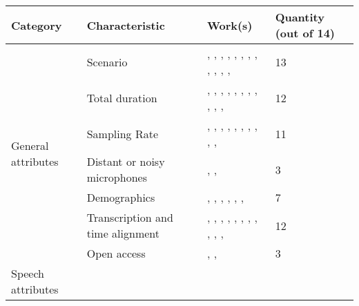 \documentclass[conference]{IEEEtran}
\begin{document}
\begin{table*}[h]
\centering
\begin{tabular}{|l|l|l|l|}
\hline
Category & Characteristic & Work(s) & Quantity (out of 14)  \\ \hline
\multirow{7}{*}{General attributes} 
    & Scenario & 
    \cite{almeman2018building}, \cite{dwivedi2017documenting}, \cite{bougrine2017altruistic}, \cite{bougrine2017altruistic}, \cite{moore2017sheffield}, \cite{ramli2017first}, \cite{goldman2016siwis}, \cite{liu2016sheffield}, \cite{ruilan2016improving}, \cite{klessa2013paralingua}, \cite{nagino2008building},  \cite{clopper2006nationwide}, \cite{zhang2008improved} & 13
    \\ \cline{2-4} & Total duration &
    \cite{dwivedi2017documenting}, \cite{bougrine2017altruistic}, \cite{bougrine2017altruistic}, \cite{moore2017sheffield}, \cite{ramli2017first}, \cite{goldman2016siwis}, \cite{liu2016sheffield}, \cite{ruilan2016improving}, \cite{klessa2013paralingua}, \cite{nagino2008building}, \cite{clopper2006nationwide}, \cite{zhang2008improved} & 12
    \\ \cline{2-4} & Sampling Rate &
    \cite{almeman2018building}, \cite{dwivedi2017documenting}, \cite{bougrine2017altruistic}, \cite{ng2017shefce}, \cite{moore2017sheffield}, \cite{ramli2017first}, \cite{goldman2016siwis}, \cite{liu2016sheffield}, \cite{ruilan2016improving}, \cite{klessa2013paralingua}, \cite{clopper2006nationwide} & 11
    \\ \cline{2-4}& Distant or noisy microphones & 
    \cite{moore2017sheffield}, \cite{ramli2017first}, \cite{liu2016sheffield} & 3
    \\ \cline{2-4} & Demographics &
    \cite{dwivedi2017documenting}, \cite{bougrine2017altruistic}, \cite{ng2017shefce}, \cite{goldman2016siwis}, \cite{ruilan2016improving}, \cite{klessa2013paralingua}, \cite{clopper2006nationwide} & 7
    \\ \cline{2-4} & Transcription and time alignment & %
    \cite{dwivedi2017documenting}, \cite{bougrine2017altruistic}, \cite{bougrine2017altruistic}, \cite{ng2017shefce}, \cite{moore2017sheffield}, \cite{ramli2017first}, \cite{goldman2016siwis}, \cite{liu2016sheffield}, \cite{ruilan2016improving}, \cite{klessa2013paralingua}, \cite{nagino2008building}, \cite{clopper2006nationwide} & 12
    \\ \cline{2-4} & Open access &
    \cite{almeman2018building}, \cite{moore2017sheffield}, \cite{liu2016sheffield} & 3
\\ \hline \multirow{3}{*}{Speech attributes}

\end{tabular}
\end{table*}
\end{document}
